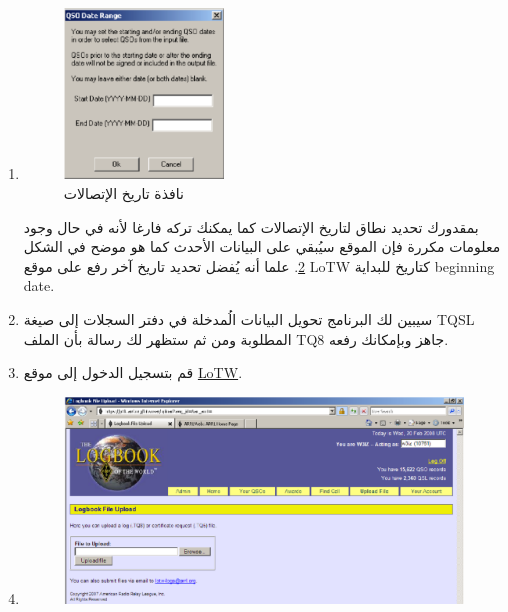 \documentclass[a4paper,12pt]{article}
\begin{document}
\begin{enumerate}
\begin{figure}[!hbtp]
			\caption{نافذة تأكيد ختم الملف}
			\label{fig:SignConfirm}
			\end{figure}
		  ستظهر نافذة تأكيد ختم الملف كما هو موضح في الشكل \ref{fig:SignConfirm}. علما أنه في حال وجود أكثر من إشارة نداء
		  على الجهاز فيجب عليك التأكد من أنك تقوم بختم الملف بإشارة النداء
		  الصحيحة.
\clearpage
		\item
			\begin{figure}[!hbtp]
			\centering
			\includegraphics[width=0.4\textwidth]{signqsodaterange.eps}
			\caption{نافذة تاريخ الإتصالات}
			\label{fig:SignQSODate}
			\end{figure}
		  بمقدورك تحديد نطاق لتاريخ الإتصالات كما يمكنك تركه فارغا لأنه في حال
		  وجود معلومات مكررة فإن الموقع سيُبقي على البيانات الأحدث كما هو موضح في الشكل \ref{fig:SignQSODate}. علما أنه يُفضل
		  تحديد تاريخ آخر رفع على موقع \textenglish{LoTW} كتاريخ للبداية \textenglish{beginning date}.
		\item
		  سيبين لك البرنامج تحويل البيانات الُمدخلة في دفتر السجلات إلى صيغة
		  \textenglish{TQSL} المطلوبة ومن ثم ستظهر لك رسالة بأن الملف \textenglish{TQ8} جاهز وبإمكانك رفعه.
		\item
			  قم بتسجيل الدخول إلى موقع \href{https://p1k.arrl.org/lotwuser/default}{\textenglish{LoTW}}.
\clearpage
		\item
			\begin{figure}[!hbtp]
			\centering
			\includegraphics[width=1.0\textwidth]{signlotw.eps}

\end{figure}
\end{enumerate}
\end{document}
